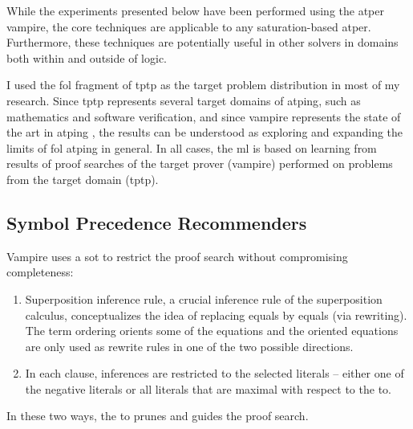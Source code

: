 While the experiments presented below have been performed using the \gls{atper} \gls{vampire},
the core techniques are applicable to any \gls{saturation}-based \gls{atper}.
Furthermore, these techniques are potentially useful in other solvers in domains both within and outside of logic.

I used the \gls{fol} fragment of \gls{tptp} as the target problem distribution in most of my research.
Since \gls{tptp} represents several target domains of \gls{atping},
such as mathematics and software verification,
and since \gls{vampire} represents the state of the art in \gls{atping} \cite{casc-j12,DBLP:journals/aicom/SutcliffeD23},
the results can be understood as exploring and expanding the limits of \gls{fol} \gls{atping} in general.
In all cases, the \gls{ml} is based on learning from results of proof searches of the target prover (\gls{vampire}) performed on problems from the target domain (\gls{tptp}).

\subsection{Symbol Precedence Recommenders}
\label{sec:contrib:SymbolPrecedenceRecommenders}

Vampire uses a \gls{sot} \cite{} to restrict the proof search without compromising completeness:
\begin{enumerate}
\item Superposition inference rule, a crucial inference rule of the superposition calculus, conceptualizes the idea of replacing equals by equals (via rewriting).
The term ordering orients some of the equations and the oriented equations are only used as rewrite rules in one of the two possible directions.
\item In each clause, inferences are restricted to the selected literals --
either one of the negative literals
or all literals that are maximal with respect to the \gls{to}.
\end{enumerate}
In these two ways, the \gls{to} prunes and guides the proof search.

